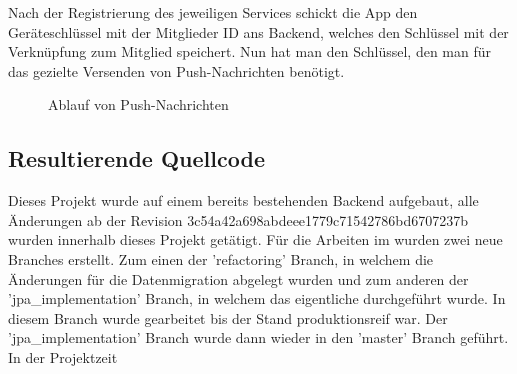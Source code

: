 Nach der Registrierung des jeweiligen Services schickt die App den Geräteschlüssel mit der Mitglieder ID ans Backend, welches den Schlüssel mit der Verknüpfung zum Mitglied speichert. Nun hat man den Schlüssel, den man für das gezielte Versenden von Push-Nachrichten benötigt.
\begin{figure}[ht]
\centering
{}
\label{fig:app_settings}
\caption{Ablauf von Push-Nachrichten}
\end{figure}

\subsection{Resultierende Quellcode}
Dieses Projekt wurde auf einem bereits bestehenden Backend aufgebaut, alle Änderungen ab der Revision 3c54a42a698abdeee1779c71542786bd6707237b wurden innerhalb dieses Projekt getätigt. Für die Arbeiten im  wurden zwei neue Branches erstellt. Zum einen der 'refactoring' Branch, in welchem die Änderungen für die Datenmigration abgelegt wurden und zum anderen der 'jpa\_implementation' Branch, in welchem das eigentliche  durchgeführt wurde. In diesem Branch wurde gearbeitet bis der Stand produktionsreif war. Der 'jpa\_implementation' Branch wurde dann wieder in den 'master' Branch geführt. In der Projektzeit 


